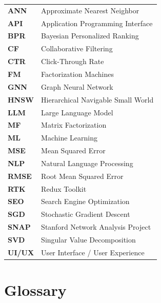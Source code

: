 \documentclass[12pt,a4paper]{report}
\begin{document}
\begin{tabular}{@{}ll@{}}
\textbf{ANN}   & Approximate Nearest Neighbor \\
\textbf{API}   & Application Programming Interface \\
\textbf{BPR}   & Bayesian Personalized Ranking \\
\textbf{CF}    & Collaborative Filtering \\
\textbf{CTR}   & Click-Through Rate \\
\textbf{FM}    & Factorization Machines \\
\textbf{GNN}   & Graph Neural Network \\
\textbf{HNSW}  & Hierarchical Navigable Small World \\
\textbf{LLM}   & Large Language Model \\
\textbf{MF}    & Matrix Factorization \\
\textbf{ML}    & Machine Learning \\
\textbf{MSE}   & Mean Squared Error \\
\textbf{NLP}   & Natural Language Processing \\
\textbf{RMSE}  & Root Mean Squared Error \\
\textbf{RTK}   & Redux Toolkit \\
\textbf{SEO}   & Search Engine Optimization \\
\textbf{SGD}   & Stochastic Gradient Descent \\
\textbf{SNAP}  & Stanford Network Analysis Project \\
\textbf{SVD}   & Singular Value Decomposition \\
\textbf{UI/UX} & User Interface / User Experience \\
\end{tabular}

\chapter*{Glossary}
\end{document}
